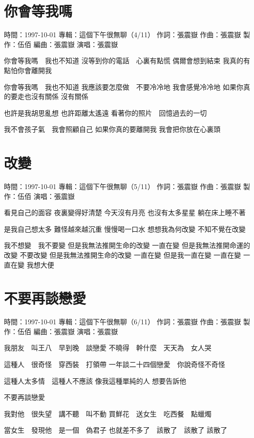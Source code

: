 \documentclass[UTF8,a4paper,oneside,twocolumn,12pt]{ctexbook}
\newcommand{\infopair}[2]{\textbullet #1：#2}
\newcommand{\zc}[1][伍佰]{\infopair{作詞}{#1}}
\newcommand{\zq}[1][伍佰]{\infopair{作曲}{#1}}
\newcommand{\bq}[1][伍佰]{\infopair{編曲}{#1}}
\newcommand{\zj}[1]{\infopair{專輯}{#1}}
\newcommand{\zz}[1]{\infopair{製作}{#1}}
\newcommand{\sj}[1]{\infopair{時間}{#1}}
\newenvironment{info}{\begin{flushleft}\kaishu
	}
	{\end{flushleft}\normalsize\yahei\par}
\newenvironment{lyric}{
	}
{}
\begin{document}
\section{你會等我嗎}
\begin{info}
	\sj{1997-10-01}
	\zj{這個下午很無聊（4/11）}
	\zc[張震嶽]
	\zq[張震嶽]
	\zz{伍佰}
	\bq[張震嶽]
	\infopair{演唱}{張震嶽}
\end{info}
\begin{lyric}
	你會等我嗎　我也不知道
	沒等到你的電話　心裏有點慌
	偶爾會想到結束 我真的有點怕你會離開我

	你會等我嗎　我也不知道
	我應該要怎麼做　不要冷冷地
	我會感覺冷冷地 如果你真的要走也沒有關係
	沒有關係

	也許是我胡思亂想 也許距離太遙遠
	看著你的照片　回憶過去的一切

	我不會孩子氣　我會照顧自己
	如果你真的要離開我
	我會把你放在心裏頭
\end{lyric}

\section{改變}
\begin{info}
	\sj{1997-10-01}
	\zj{這個下午很無聊（5/11）}
	\zc[張震嶽]
	\zq[張震嶽]
	\zz{伍佰}
	\infopair{演唱}{張震嶽}
\end{info}
\begin{lyric}
	看見自己的面容 夜裏變得好清楚
	今天沒有月亮 也沒有太多星星
	躺在床上睡不著

	是我自己想太多 難怪越來越沉重
	慢慢喝一口水 想想我為何改變
	不知不覺在改變

	我不想變　我不要變
	但是我無法推開生命的改變 一直在變
	但是我無法推開命運的改變 不要改變
	但是我無法推開生命的改變 一直在變
	但是我一直在變 一直在變
	一直在變 我想大便
\end{lyric}

\section{不要再談戀愛}
\begin{info}
	\sj{1997-10-01}
	\zj{這個下午很無聊（6/11）}
	\zc[張震嶽]
	\zq[張震嶽]
	\zz{伍佰}
	\bq[張震嶽]
	\infopair{演唱}{張震嶽}
\end{info}
\begin{lyric}
	我朋友　叫王八　早到晚　談戀愛
	不曉得　幹什麼　天天為　女人哭

	這種人　很奇怪　穿西裝　打領帶
	一年談二十四個戀愛　你說奇怪不奇怪

	這種人太多情　這種人不應該
	像我這種單純的人 想要告訴他

	不要再談戀愛

	我對他　很失望　講不聽　叫不動
	買鮮花　送女生　吃西餐　點蠟燭

	當女生　發現他　是一個　偽君子
	也就差不多了　該散了　該散了 該散了
\end{lyric}
\end{document}
